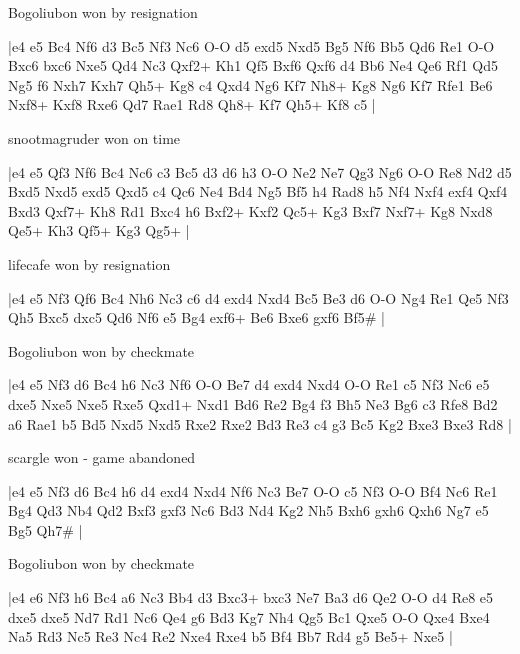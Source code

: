 \showboard

Bogoliubon won by resignation

\makegametitle
|e4 e5 Bc4 Nf6 d3 Bc5 Nf3 Nc6 O-O d5 exd5 Nxd5 Bg5 Nf6 Bb5 Qd6 Re1 O-O Bxc6 bxc6 Nxe5 Qd4 Nc3 Qxf2+ Kh1 Qf5 Bxf6 Qxf6 d4 Bb6 Ne4 Qe6 Rf1 Qd5 Ng5 f6 Nxh7 Kxh7 Qh5+ Kg8 c4 Qxd4 Ng6 Kf7 Nh8+ Kg8 Ng6 Kf7 Rfe1 Be6 Nxf8+ Kxf8 Rxe6 Qd7 Rae1 Rd8 Qh8+ Kf7 Qh5+ Kf8 c5  |

\showboard

snootmagruder won on time

\makegametitle
|e4 e5 Qf3 Nf6 Bc4 Nc6 c3 Bc5 d3 d6 h3 O-O Ne2 Ne7 Qg3 Ng6 O-O Re8 Nd2 d5 Bxd5 Nxd5 exd5 Qxd5 c4 Qc6 Ne4 Bd4 Ng5 Bf5 h4 Rad8 h5 Nf4 Nxf4 exf4 Qxf4 Bxd3 Qxf7+ Kh8 Rd1 Bxc4 h6 Bxf2+ Kxf2 Qc5+ Kg3 Bxf7 Nxf7+ Kg8 Nxd8 Qe5+ Kh3 Qf5+ Kg3 Qg5+  |

\showboard

lifecafe won by resignation

\makegametitle
|e4 e5 Nf3 Qf6 Bc4 Nh6 Nc3 c6 d4 exd4 Nxd4 Bc5 Be3 d6 O-O Ng4 Re1 Qe5 Nf3 Qh5 Bxc5 dxc5 Qd6 Nf6 e5 Bg4 exf6+ Be6 Bxe6 gxf6 Bf5\#  |

\showboard

Bogoliubon won by checkmate

\makegametitle
|e4 e5 Nf3 d6 Bc4 h6 Nc3 Nf6 O-O Be7 d4 exd4 Nxd4 O-O Re1 c5 Nf3 Nc6 e5 dxe5 Nxe5 Nxe5 Rxe5 Qxd1+ Nxd1 Bd6 Re2 Bg4 f3 Bh5 Ne3 Bg6 c3 Rfe8 Bd2 a6 Rae1 b5 Bd5 Nxd5 Nxd5 Rxe2 Rxe2 Bd3 Re3 c4 g3 Bc5 Kg2 Bxe3 Bxe3 Rd8  |

\showboard

scargle won - game abandoned

\makegametitle
|e4 e5 Nf3 d6 Bc4 h6 d4 exd4 Nxd4 Nf6 Nc3 Be7 O-O c5 Nf3 O-O Bf4 Nc6 Re1 Bg4 Qd3 Nb4 Qd2 Bxf3 gxf3 Nc6 Bd3 Nd4 Kg2 Nh5 Bxh6 gxh6 Qxh6 Ng7 e5 Bg5 Qh7\#  |

\showboard

Bogoliubon won by checkmate

\makegametitle
|e4 e6 Nf3 h6 Bc4 a6 Nc3 Bb4 d3 Bxc3+ bxc3 Ne7 Ba3 d6 Qe2 O-O d4 Re8 e5 dxe5 dxe5 Nd7 Rd1 Nc6 Qe4 g6 Bd3 Kg7 Nh4 Qg5 Bc1 Qxe5 O-O Qxe4 Bxe4 Na5 Rd3 Nc5 Re3 Nc4 Re2 Nxe4 Rxe4 b5 Bf4 Bb7 Rd4 g5 Be5+ Nxe5  |

